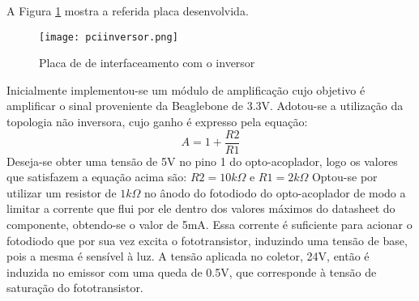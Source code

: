 	A Figura \ref{pciinversor} mostra a referida placa desenvolvida.
	\begin{figure}[!h]
		\centering
		\texttt{[image: pciinversor.png]}
		\caption{Placa de de interfaceamento com o inversor}
		\label{pciinversor}
	\end{figure}

	Inicialmente implementou-se um módulo de amplificação cujo objetivo é amplificar o sinal proveniente da Beaglebone de 3.3V. Adotou-se a utilização da topologia não inversora, cujo ganho é expresso pela equação:
	$$ A = 1 + \frac{R2}{R1} $$
	Deseja-se obter uma tensão de 5V no pino 1 do opto-acoplador, logo os valores que satisfazem a equação acima são: $R2 = 10k\Omega$ e $ R1 = 2k\Omega $
	Optou-se por utilizar um resistor de $1k\Omega$ no ânodo do fotodiodo do opto-acoplador de modo a limitar a corrente que flui por ele dentro dos valores máximos do datasheet do componente, obtendo-se o valor de 5mA. Essa corrente é suficiente para acionar o fotodiodo que por sua vez excita o fototransistor, induzindo uma tensão de base, pois a mesma é sensível à luz. A tensão aplicada no coletor, 24V, então é induzida no emissor com uma queda de 0.5V, que corresponde à tensão de saturação do fototransistor.	
